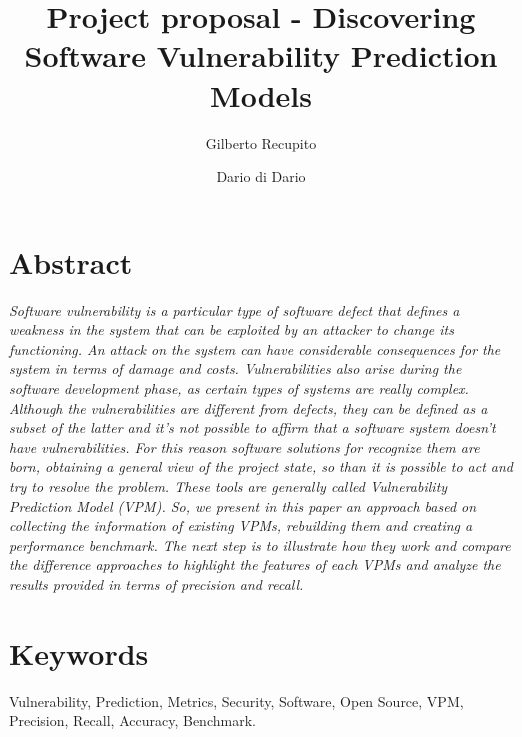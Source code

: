 \documentclass[twocolumn,10pt]{asme2ej}
\title{Project proposal - Discovering Software Vulnerability Prediction Models}
\author{Gilberto Recupito
    \affiliation{
	Università degli Studi di Salerno \\
    Email: g.recupito@studenti.unisa.it
    }	
}
\author{Dario di Dario
    \affiliation{	Università degli Studi di Salerno \\
    	Email: d.didario@studenti.unisa.it
    }
}
\author{
    }
\begin{document}
\maketitle    

\section*{Abstract}
{\textit{Software vulnerability is a particular type of software defect that defines a weakness in the system that can be exploited by an attacker to change its functioning.
An attack on the system can have considerable consequences for the system in terms of damage and costs.
Vulnerabilities also arise during the software development phase, as certain types of systems are really complex.
Although the vulnerabilities are different from defects, they can be defined as a subset of the latter and it’s not possible to affirm that a software system doesn’t have vulnerabilities.
For this reason software solutions for recognize them are born, obtaining a general view of the project state, so than it is possible to act and try to resolve the problem.
These tools are generally called Vulnerability Prediction Model (VPM). 
So, we present in this paper an approach based on collecting the information of existing VPMs, rebuilding them and creating a performance benchmark. The next step is to illustrate how they work and compare the difference approaches to highlight the features of each VPMs and analyze the results provided in terms of precision and recall.
}  


}


\section*{Keywords}
Vulnerability, Prediction, Metrics, Security, Software, Open Source, VPM, Precision, Recall, Accuracy, Benchmark.

\end{document}
